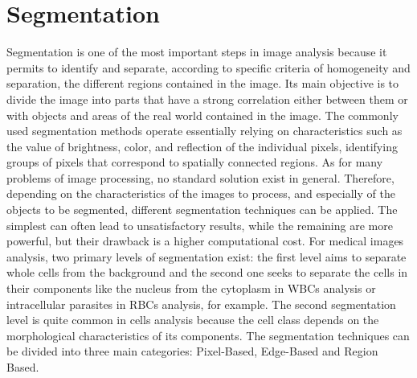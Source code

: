 \documentclass[final,a4paper,12pt,english]{UnicaPhdThesis3}
\begin{document}
\chapter{Segmentation}
Segmentation is one of the most important steps in image analysis because it permits to identify and separate, according to specific criteria of homogeneity and separation, the different regions contained in the image. Its main objective is to divide the image into parts that have a strong correlation either between them or with objects and areas of the real world contained in the image. The commonly used segmentation methods operate essentially relying on characteristics such as the value of brightness, color, and reflection of the individual pixels, identifying groups of pixels that correspond to spatially connected regions. 
As for many problems of image processing, no standard solution exist in general. Therefore, depending on the characteristics of the images to process, and especially of the objects to be segmented, different segmentation techniques can be applied. The simplest can often lead to unsatisfactory results, while the remaining are more powerful, but their drawback is a higher computational cost. For medical images analysis, two primary levels of segmentation exist: the first level aims to separate whole cells from the background and the second one seeks to separate the cells in their components like the nucleus from the cytoplasm in WBCs analysis or intracellular parasites in RBCs analysis, for example. The second segmentation level is quite common in cells analysis because the cell class depends on the morphological characteristics of its components. The segmentation techniques can be divided into three main categories: Pixel-Based, Edge-Based and Region Based.
\end{document}
